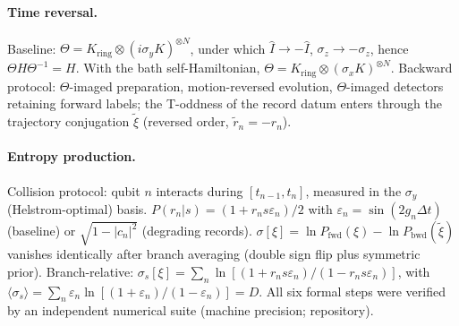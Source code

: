 \documentclass[11pt]{article}
\newcommand{\Iop}{\hat{I}}
\begin{document}
\paragraph{Time reversal.}
Baseline: $\Theta = K_{\mathrm{ring}}\otimes(i\sigma_yK)^{\otimes N}$, under which $\Iop\to-\Iop$, $\sigma_z\to-\sigma_z$, hence $\Theta H\Theta^{-1}=H$. With the bath self-Hamiltonian, $\Theta = K_{\mathrm{ring}}\otimes(\sigma_xK)^{\otimes N}$. Backward protocol: $\Theta$-imaged preparation, motion-reversed evolution, $\Theta$-imaged detectors retaining forward labels; the T-oddness of the record datum enters through the trajectory conjugation $\tilde\xi$ (reversed order, $\tilde r_n=-r_n$).

\paragraph{Entropy production.}
Collision protocol: qubit $n$ interacts during $[t_{n-1},t_n]$, measured in the $\sigma_y$ (Helstrom-optimal) basis. $P(r_n|s)=(1+r_ns\varepsilon_n)/2$ with $\varepsilon_n=\sin(2g_n\Delta t)$ (baseline) or $\sqrt{1-|c_n|^2}$ (degrading records). $\sigma[\xi]=\ln P_{\mathrm{fwd}}(\xi)-\ln P_{\mathrm{bwd}}(\tilde\xi)$ vanishes identically after branch averaging (double sign flip plus symmetric prior). Branch-relative: $\sigma_s[\xi]=\sum_n\ln[(1+r_ns\varepsilon_n)/(1-r_ns\varepsilon_n)]$, with $\langle\sigma_s\rangle=\sum_n\varepsilon_n\ln[(1+\varepsilon_n)/(1-\varepsilon_n)]=D$. All six formal steps were verified by an independent numerical suite (machine precision; repository).
\end{document}
